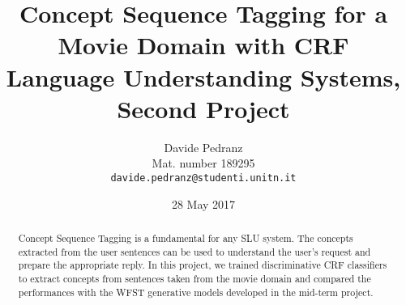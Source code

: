 \documentclass[11pt,a4paper]{article}
\title{
  Concept Sequence Tagging for a Movie Domain with CRF \\
  Language Understanding Systems, Second Project
}
\author{Davide Pedranz \\
  Mat. number 189295 \\
  {\tt davide.pedranz@studenti.unitn.it}
}
\date{28 May 2017}
\begin{document}
\maketitle

\begin{abstract}
Concept Sequence Tagging is a fundamental for any \ac{SLU} system.
The concepts extracted from the user sentences can be used to understand the user's request and prepare the appropriate reply.
In this project, we trained discriminative \ac{CRF} classifiers to extract concepts from sentences taken from the movie domain and compared the performances with the \ac{WFST} generative models developed in the mid-term project.
\end{abstract}





\end{document}
